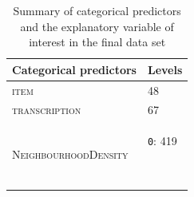 \begin{table}\fontsize{10}{11}
\caption{Summary of categorical predictors and the explanatory variable of interest in the final data set}
\label{tab:4.2}
\centering
\begin{tabular}{ll}
\lsptoprule
Categorical predictors                & Levels                                                   \\
\midrule
\textsc{item}                                  & 48                                                       \\
\textsc{transcription}                         & 67                                                       \\
\multirow{2}{*}{\textsc{NeighbourhoodDensity}} & \texttt{0}: 419

~ ~~


\end{tabular}
\end{table}
